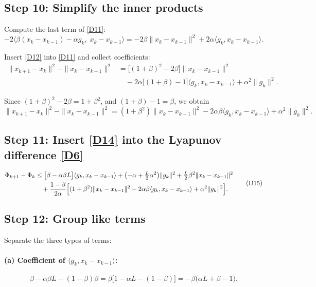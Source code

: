 \documentclass{article}
\begin{document}
\subsection*{Step 10: Simplify the inner products}
Compute the last term of \eqref{D11}:
\[
-2\langle\beta (x_k-x_{k-1})-\alpha g_k,\;x_k-x_{k-1}\rangle
= -2\beta\|x_k-x_{k-1}\|^2 + 2\alpha\langle g_k, x_k-x_{k-1}\rangle .
\tag{D12}
\]

Insert \eqref{D12} into \eqref{D11} and collect coefficients:
\[
\begin{aligned}
\|x_{k+1}-x_k\|^2-\|x_k-x_{k-1}\|^2
&= \bigl[(1+\beta)^2-2\beta\bigr]\|x_k-x_{k-1}\|^2 \\
&\quad -2\alpha\bigl[(1+\beta)-1\bigr]\langle g_k, x_k-x_{k-1}\rangle
   +\alpha^2\|g_k\|^2 .
\end{aligned}
\tag{D13}
\]

Since $(1+\beta)^2-2\beta = 1+\beta^2$, and $(1+\beta)-1=\beta$, we obtain
\[
\|x_{k+1}-x_k\|^2-\|x_k-x_{k-1}\|^2
= (1+\beta^2)\|x_k-x_{k-1}\|^2
  -2\alpha\beta\langle g_k, x_k-x_{k-1}\rangle
  +\alpha^2\|g_k\|^2 .
\tag{D14}
\]

\subsection*{Step 11: Insert \eqref{D14} into the Lyapunov difference \eqref{D6}}
\[
\begin{aligned}
\Phi_{k+1}-\Phi_k
&\le \bigl[\beta-\alpha\beta L\bigr]\langle g_k, x_k-x_{k-1}\rangle
   +\bigl(-\alpha+\tfrac{L}{2}\alpha^2\bigr)\|g_k\|^2
   +\tfrac{L}{2}\beta^2\|x_k-x_{k-1}\|^2   \\
&\quad +\frac{1-\beta}{2\alpha}\Bigl[(1+\beta^2)\|x_k-x_{k-1}\|^2
          -2\alpha\beta\langle g_k, x_k-x_{k-1}\rangle
          +\alpha^2\|g_k\|^2\Bigr] .
\end{aligned}
\tag{D15}
\]

\subsection*{Step 12: Group like terms}
Separate the three types of terms:

\paragraph{(a) Coefficient of $\langle g_k, x_k-x_{k-1}\rangle$:}
\[
\beta-\alpha\beta L - (1-\beta)\beta
= \beta\bigl[1-\alpha L-(1-\beta)\bigr]
= -\beta\bigl(\alpha L +\beta-1\bigr) .
\tag{D16}
\]
\end{document}
